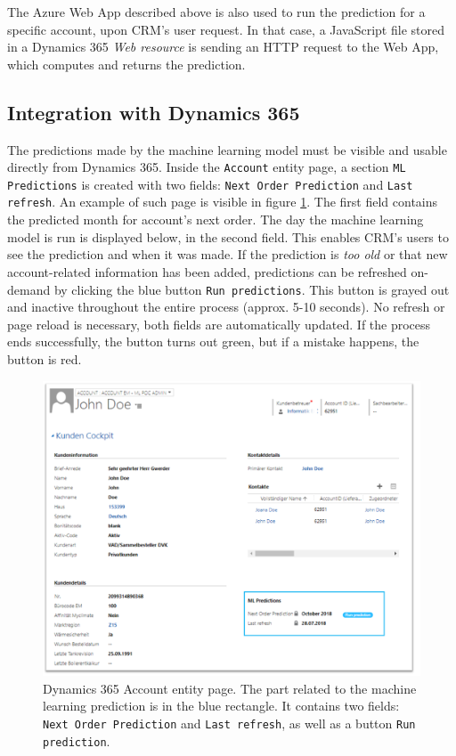 The Azure Web App described above is also used to run the prediction for a specific account, upon CRM's user request. In that case, a JavaScript file stored in a Dynamics 365 \textit{Web resource} is sending an HTTP request to the Web App, which computes and returns the prediction.

\subsection{Integration with Dynamics 365}
The predictions made by the machine learning model must be visible and usable directly from Dynamics 365. Inside the \texttt{Account} entity page, a section \texttt{ML Predictions} is created with two fields: \texttt{Next Order Prediction} and \texttt{Last refresh}. An example of such page is visible in figure \ref{fig:dynamics-account-ml-screenshot}. The first field contains the predicted month for account's next order. The day the machine learning model is run is displayed below, in the second field. This enables CRM's users to see the prediction and when it was made. If the prediction is \textit{too old} or that new account-related information has been added, predictions can be refreshed on-demand by clicking the blue button \texttt{Run predictions}. This button is grayed out and inactive throughout the entire process (approx. 5-10 seconds). No refresh or page reload is necessary, both fields are automatically updated. If the process ends successfully, the button turns out green, but if a mistake happens, the button is red.

\begin{figure}[!htb]
    \centering
    \includegraphics[width=12cm]{images/dynamics-account-ml-screenshot.png}
    \caption[Dynamics 365 \textit{Account} entity page]{Dynamics 365 Account entity page. The part related to the machine learning prediction is in the blue rectangle. It contains two fields: \texttt{Next Order Prediction} and \texttt{Last refresh}, as well as a button \texttt{Run prediction}.}
    \label{fig:dynamics-account-ml-screenshot}
\end{figure}

